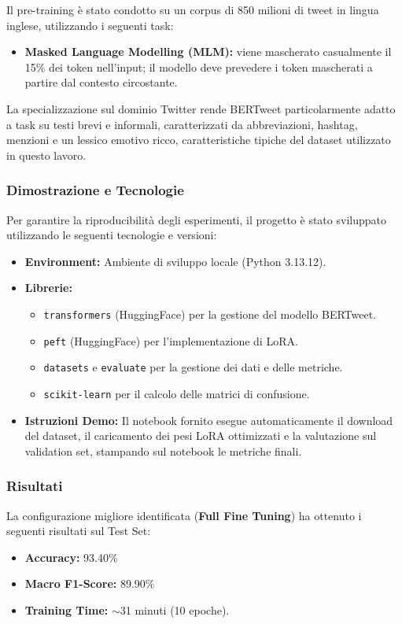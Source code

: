 \documentclass[a4paper,12pt]{article}
\begin{document}
Il pre-training è stato condotto su un corpus di 850 milioni di tweet in lingua inglese,
utilizzando i seguenti task:

\begin{itemize}
    \item \textbf{Masked Language Modelling (MLM):} viene mascherato casualmente il 15\%
          dei token nell'input; il modello deve prevedere i token mascherati a partire dal contesto circostante.
\end{itemize}

La specializzazione sul dominio Twitter rende BERTweet particolarmente adatto a task su testi brevi
e informali, caratterizzati da abbreviazioni, hashtag, menzioni e un lessico emotivo ricco,
caratteristiche tipiche del dataset utilizzato in questo lavoro.
\subsubsection{Dimostrazione e Tecnologie}
Per garantire la riproducibilità degli esperimenti, il progetto è stato sviluppato utilizzando le seguenti tecnologie e versioni:
\begin{itemize}
    \item \textbf{Environment:} Ambiente di sviluppo locale (Python 3.13.12).
    \item \textbf{Librerie:}
          \begin{itemize}
              \item \texttt{transformers} (HuggingFace) per la gestione del modello BERTweet.
              \item \texttt{peft} (HuggingFace) per l'implementazione di LoRA.
              \item \texttt{datasets} e \texttt{evaluate} per la gestione dei dati e delle metriche.
              \item \texttt{scikit-learn} per il calcolo delle matrici di confusione.
          \end{itemize}
    \item \textbf{Istruzioni Demo:} Il notebook fornito esegue automaticamente il download del dataset, il caricamento dei
          pesi LoRA ottimizzati e la valutazione sul validation set, stampando sul notebook le metriche finali.
\end{itemize}

\subsubsection{Risultati}
La configurazione migliore identificata (\textbf{Full Fine Tuning}) ha ottenuto i seguenti risultati sul Test Set:
\begin{itemize}
    \item \textbf{Accuracy:} 93.40\%
    \item \textbf{Macro F1-Score:} 89.90\%
    \item \textbf{Training Time:} $\sim$31 minuti (10 epoche).
\end{itemize}
\end{document}
